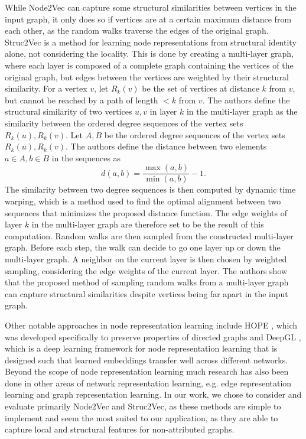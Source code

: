 \documentclass[draft,final]{vutinfth} %
\begin{document}
While Node2Vec can capture some structural similarities between vertices in the input graph, it only does so if vertices are at a certain maximum distance from each other, as the random walks traverse the edges of the original graph. Struc2Vec \cite{FigueiredoRS17} is a method for learning node representations from structural identity alone, not considering the locality. 
This is done by creating a multi-layer graph, where each layer is composed of a complete graph containing the vertices of the original graph, but edges between the vertices are weighted by their structural similarity. 
For a vertex $v$, let $R_k(v)$ be the set of vertices at distance $k$ from $v$, but cannot be reached by a path of length $< k$ from $v$. 
The authors define the structural similarity of two vertices $u,v$ in layer $k$ in the multi-layer graph as the similarity between the ordered degree sequences of the vertex sets $R_k(u), R_k(v)$.
Let $A, B$ be the ordered degree sequences of the vertex sets $R_k(u), R_k(v)$. The authors define the distance between two elements $a \in A, b \in B$ in the sequences as 
\[
    d(a,b) = \frac{\max(a,b)}{\min(a,b) } - 1.
\]
The similarity between two degree sequences is then computed by dynamic time warping, which is a method used to find the optimal alignment between two sequences that minimizes the proposed distance function. The edge weights of layer $k$ in the multi-layer graph are therefore set to be the result of this computation. 
Random walks are then sampled from the constructed multi-layer graph. Before each step, the walk can decide to go one layer up or down the multi-layer graph. A neighbor on the current layer is then chosen by weighted sampling, considering the edge weights of the current layer. 
The authors show that the proposed method of sampling random walks from a multi-layer graph can capture structural similarities despite vertices being far apart in the input graph. 

Other notable approaches in node representation learning include HOPE \cite{Mingdong2016}, which was developed specifically to preserve properties of directed graphs and DeepGL \cite{Rossi17a}, which is a deep learning framework for node representation learning that is designed such that learned embeddings transfer well across different networks. Beyond the scope of node representation learning much research has also been done in other areas of network representation learning, e.g. edge representation learning and graph representation learning. In our work, we chose to consider and evaluate primarily Node2Vec and Struc2Vec, as these methods are simple to implement and seem the most suited to our application, as they are able to capture local and structural features for non-attributed graphs. 
\end{document}
